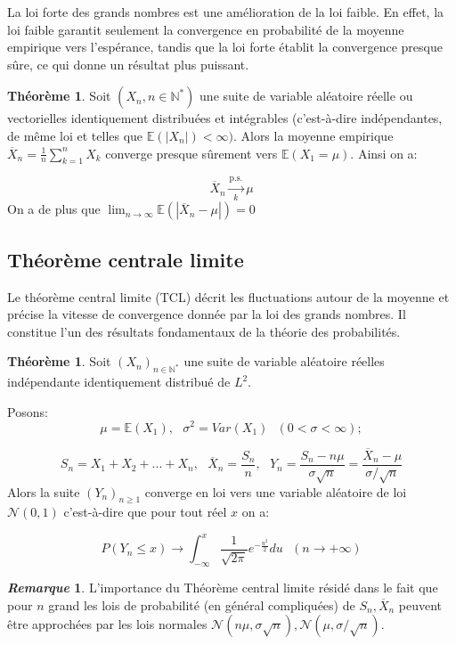 \documentclass[12pt,a4paper,twoside,fleqn]{book}%
\theoremstyle{definition}
\newtheorem{rem}{\textit{Remarque}}[section]
\newtheorem{thm}[dfn]{Théorème}
\theoremstyle{lemme}
\numberwithin{equation}{section}
\begin{document}
	La loi forte des grands nombres est une amélioration de la loi faible. En effet, la loi faible garantit seulement la convergence en probabilité de la moyenne empirique vers l’espérance, tandis que la loi forte établit la convergence presque sûre, ce qui donne un résultat plus puissant.
\begin{thm}
	 Soit $(X_n, n\in\mathbb{N}^*)$ une suite de variable aléatoire réelle ou vectorielles identiquement distribuées et intégrables (c'est-à-dire indépendantes, de même loi et telles que $\mathbb{E}(|X_n|)<\infty)$. Alors la moyenne empirique $\overline{X}_n=\frac{1}{n}\sum_{k=1}^{n}X_k$ converge presque sûrement vers $\mathbb{E}(X_1=\mu).$ Ainsi on a:
	 
	 \begin{equation}\label{eq:2.1.2}
	 	\overline{X}_n \xrightarrow[k]{\text{p.s.}} \mu
	 \end{equation}
	 On a de plus que $\lim_{n \to \infty}\mathbb{E}\left(|\overline{X}_n-\mu|\right) =0$
\end{thm}

\subsection{Théorème centrale limite}
Le théorème central limite (TCL) décrit les fluctuations autour de la moyenne et précise la vitesse de convergence donnée par la loi des grands nombres. Il constitue l’un des résultats fondamentaux de la théorie des probabilités.
 
 \begin{thm}\label{thm:2.1.4}
 	Soit $(X_n)_{n\in\mathbb{N}^*}$ une suite de variable aléatoire réelles indépendante identiquement distribué de $L^2$.
 	
 	Posons:
 	\[
 	\mu = \mathbb{E}(X_1), \text{    } \sigma^2 = Var(X_1) \text{  } (0<\sigma<\infty);
 	\]
 	
 	\begin{equation}\label{eq:2.1.3}
 	S_n = X_1 + X_2 +...+ X_n,\text{      } \overline{X}_n=\frac{S_n}{n},\text{   }Y_n=\frac{S_n-n\mu}{\sigma\sqrt{n}}=\frac{\overline{X}_n -\mu}{\sigma/\sqrt{n}}
 	\end{equation}
 	Alors la suite $(Y_n)_{n\geq 1}$ converge en loi vers une variable aléatoire de loi $\mathcal{N}(0,1)$ c'est-à-dire que pour tout réel $x$ on a:
 	
 	\[
 	P(Y_n\leq x) \longrightarrow \int_{-\infty}^{x}\frac{1}{\sqrt{2\pi}}e^{-\frac{u^2}{2}}du \text{       } (n\to +\infty)
 	\]	
 \end{thm}
\begin{rem}
	L'importance du Théorème central limite résidé dans le fait que pour $n$ grand les lois de probabilité (en général compliquées) de $S_n,\overline{X}_n$ peuvent être approchées par les lois normales $\mathcal{N}(n\mu,\sigma\sqrt{n}),\mathcal{N}(\mu,\sigma/\sqrt{n}).$
\end{rem}	
	
\end{document}

